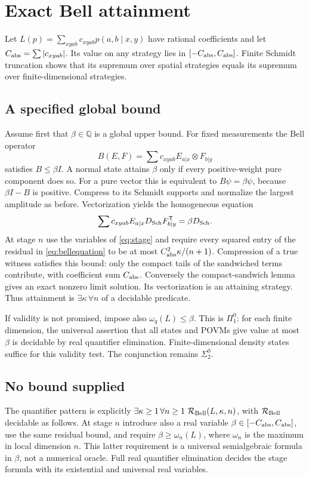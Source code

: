 \section{Exact Bell attainment}\label{sec:bell}
Let $L(p)=\sum_{xyab}c_{xyab}p(a,b\mid x,y)$ have rational coefficients and let $C_{\rm abs}=\sum|c_{xyab}|$. Its value on any strategy lies in $[-C_{\rm abs},C_{\rm abs}]$. Finite Schmidt truncation shows that its supremum over spatial strategies equals its supremum over finite-dimensional strategies.

\subsection{A specified global bound}
Assume first that $\beta\in\mathbb Q$ is a global upper bound. For fixed measurements the Bell operator
\[
 B(E,F)=\sum c_{xyab}E_{a|x}\otimes F_{b|y}
\]
satisfies $B\leq\beta I$. A normal state attains $\beta$ only if every positive-weight pure component does so. For a pure vector this is equivalent to $B\psi=\beta\psi$, because $\beta I-B$ is positive. Compress to its Schmidt supports and normalize the largest amplitude as before. Vectorization yields the homogeneous equation
\begin{equation}\label{eq:bellequation}
 \sum c_{xyab}E_{a|x}D_{\rm Sch}F_{b|y}^{\mathsf T}=\beta D_{\rm Sch}.
\end{equation}
At stage $n$ use the variables of \eqref{eq:stage} and require every squared entry of the residual in \eqref{eq:bellequation} to be at most $C_{\rm abs}^2\kappa/(n+1)$. Compression of a true witness satisfies this bound: only the compact tails of the sandwiched terms contribute, with coefficient sum $C_{\rm abs}$. Conversely the compact-sandwich lemma gives an exact nonzero limit solution. Its vectorization is an attaining strategy. Thus attainment is $\exists \kappa\,\forall n$ of a decidable predicate.

If validity is not promised, impose also $\omega_q(L)\leq\beta$. This is $\Pi^0_1$: for each finite dimension, the universal assertion that all states and POVMs give value at most $\beta$ is decidable by real quantifier elimination. Finite-dimensional density states suffice for this validity test. The conjunction remains $\Sigma^0_2$.

\subsection{No bound supplied}
The quantifier pattern is explicitly $\exists \kappa\geq1\,\forall n\geq1\ \mathcal R_{\rm Bell}(L,\kappa,n)$, with $\mathcal R_{\rm Bell}$ decidable as follows. At stage $n$ introduce also a real variable $\beta\in[-C_{\rm abs},C_{\rm abs}]$, use the same residual bound, and require $\beta\geq\omega_n(L)$, where $\omega_n$ is the maximum in local dimension $n$. This latter requirement is a universal semialgebraic formula in $\beta$, not a numerical oracle. Full real quantifier elimination decides the stage formula with its existential and universal real variables.

